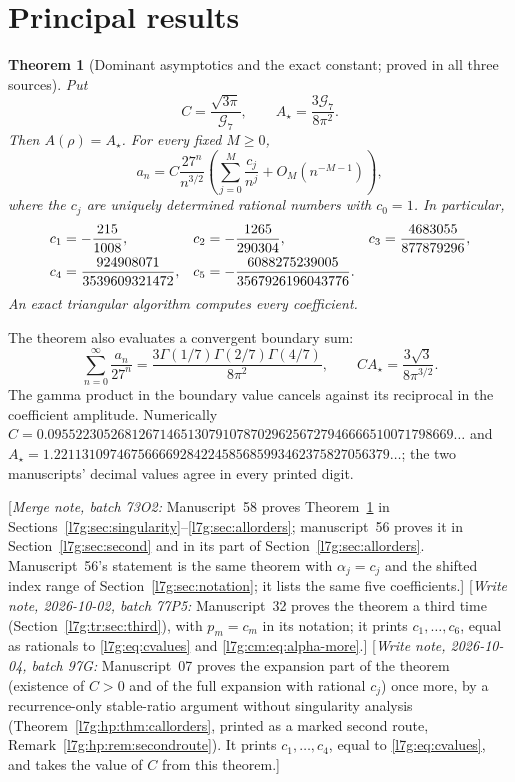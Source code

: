 \documentclass[11pt,letterpaper]{article}
\newtheorem{theorem}{Theorem}[section]
\theoremstyle{remark}\newtheorem{remark}[theorem]{Remark}
\newcommand{\G}{\mathcal G_7}\newcommand{\Ast}{A_\star}
\newcommand{\mergenote}[1]{\textup{[}\emph{Merge note, batch 73O2:} #1\textup{]}}
\newcommand{\writenote}[1]{\textup{[}\emph{Write note, 2026-10-02, batch 77P5:} #1\textup{]}}
\newcommand{\hpnote}[1]{\textup{[}\emph{Write note, 2026-10-04, batch 97G:} #1\textup{]}}
\newcounter{l7gtrsavedeq}
\begin{document}
\section{Principal results}\label{l7g:sec:principal}
\begin{theorem}[Dominant asymptotics and the exact constant; proved in all three sources]\label{l7g:th:main}
Put
\begin{equation}\label{l7g:eq:C}
 C=\frac{\sqrt{3\pi}}{\G},\qquad \Ast=\frac{3\G}{8\pi^2}.
\end{equation}
Then $A(\rho)=\Ast$. For every fixed $M\ge0$,
\begin{equation}\label{l7g:eq:dominant}
 a_n=C\frac{27^n}{n^{3/2}}
 \left(\sum_{j=0}^M\frac{c_j}{n^j}+O_M(n^{-M-1})\right),
\end{equation}
where the $c_j$ are uniquely determined rational numbers with $c_0=1$.
In particular,
\begin{align}\label{l7g:eq:cvalues}
 c_1&=-\frac{215}{1008},&c_2&=-\frac{1265}{290304},&
 c_3&=\frac{4683055}{877879296},\notag\\
 c_4&=\frac{924908071}{3539609321472},&
 c_5&=-\frac{6088275239005}{3567926196043776}.
\end{align}
An exact triangular algorithm computes every coefficient.
\end{theorem}
The theorem also evaluates a convergent boundary sum:
\begin{equation}\label{l7g:eq:boundarysum}
 \sum_{n=0}^{\infty}\frac{a_n}{27^n}
 =\frac{3\Gamma(1/7)\Gamma(2/7)\Gamma(4/7)}{8\pi^2},
 \qquad C\Ast=\frac{3\sqrt3}{8\pi^{3/2}}.
\end{equation}
The gamma product in the boundary value cancels against its reciprocal
in the coefficient amplitude. Numerically
$C=0.0955223052681267146513079107870296256727946666510071798669\ldots$ and
$\Ast=1.221131097467566669284224585685993462375827056379\ldots$; the two
manuscripts' decimal values agree in every printed digit.

\mergenote{Manuscript~58 proves Theorem~\ref{l7g:th:main} in
Sections~\ref{l7g:sec:singularity}--\ref{l7g:sec:allorders}; manuscript~56
proves it in Section~\ref{l7g:sec:second} and in its part of
Section~\ref{l7g:sec:allorders}. Manuscript~56's statement is the same
theorem with $\alpha_j=c_j$ and the shifted index range of
Section~\ref{l7g:sec:notation}; it lists the same five coefficients.}
\writenote{Manuscript~32 proves the theorem a third time
(Section~\ref{l7g:tr:sec:third}), with $p_m=c_m$ in its notation; it
prints $c_1,\dots,c_6$, equal as rationals to \eqref{l7g:eq:cvalues} and
\eqref{l7g:cm:eq:alpha-more}.}
\hpnote{Manuscript~07 proves the expansion part of the theorem (existence
of $C>0$ and of the full expansion with rational $c_j$) once more, by a
recurrence-only stable-ratio argument without singularity analysis
(Theorem~\ref{l7g:hp:thm:callorders}, printed as a marked second route,
Remark~\ref{l7g:hp:rem:secondroute}). It prints $c_1,\dots,c_4$, equal to
\eqref{l7g:eq:cvalues}, and takes the value of $C$ from this theorem.}
\end{document}
